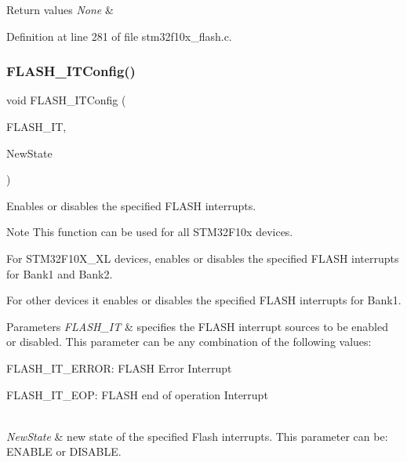 \begin{DoxyRetVals}{Return values}
{\em None} & \\
\hline
\end{DoxyRetVals}


Definition at line 281 of file stm32f10x\+\_\+flash.\+c.

\mbox{\label{group___f_l_a_s_h___private___functions_ga94c1e51a9c3bf8d48eb6eb4a4d054861}} 
\subsubsection{\texorpdfstring{F\+L\+A\+S\+H\+\_\+\+I\+T\+Config()}{FLASH\_ITConfig()}}
{\footnotesize\ttfamily void F\+L\+A\+S\+H\+\_\+\+I\+T\+Config (\begin{DoxyParamCaption}\item[{uint32\+\_\+t}]{F\+L\+A\+S\+H\+\_\+\+IT,  }\item[{\hyperlink{group___exported__types_gac9a7e9a35d2513ec15c3b537aaa4fba1}{Functional\+State}}]{New\+State }\end{DoxyParamCaption})}



Enables or disables the specified F\+L\+A\+SH interrupts. 

\begin{DoxyNote}{Note}
This function can be used for all S\+T\+M32\+F10x devices.
\begin{DoxyItemize}
\item For S\+T\+M32\+F10\+X\+\_\+\+XL devices, enables or disables the specified F\+L\+A\+SH interrupts for Bank1 and Bank2.
\item For other devices it enables or disables the specified F\+L\+A\+SH interrupts for Bank1. 
\end{DoxyItemize}
\end{DoxyNote}

\begin{DoxyParams}{Parameters}
{\em F\+L\+A\+S\+H\+\_\+\+IT} & specifies the F\+L\+A\+SH interrupt sources to be enabled or disabled. This parameter can be any combination of the following values\+: \begin{DoxyItemize}
\item F\+L\+A\+S\+H\+\_\+\+I\+T\+\_\+\+E\+R\+R\+OR\+: F\+L\+A\+SH Error Interrupt \item F\+L\+A\+S\+H\+\_\+\+I\+T\+\_\+\+E\+OP\+: F\+L\+A\+SH end of operation Interrupt \end{DoxyItemize}
\\
\hline
{\em New\+State} & new state of the specified Flash interrupts. This parameter can be\+: E\+N\+A\+B\+LE or D\+I\+S\+A\+B\+LE. \\
\hline
\end{DoxyParams}

